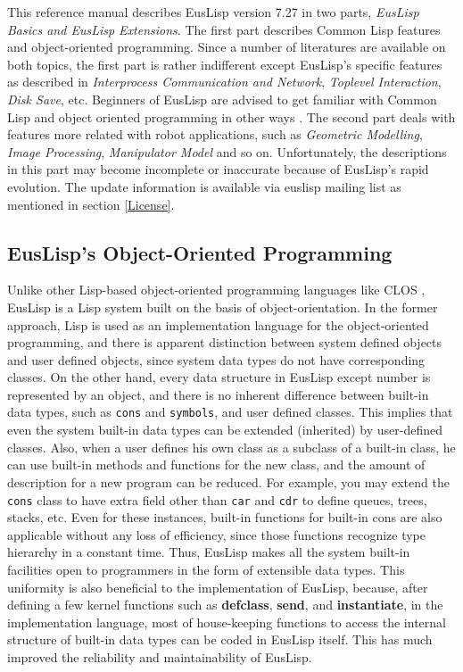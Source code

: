 This reference manual describes EusLisp version 7.27 in two parts,
{\em  EusLisp Basics and EusLisp Extensions}.
The first part describes Common Lisp features and object-oriented 
programming. Since a number of literatures are available on both topics,
the first part is rather indifferent except EusLisp's specific
features as described in {\em Interprocess Communication and Network},
{\em Toplevel Interaction}, {\em Disk Save}, etc.
Beginners of EusLisp are advised to get familiar with
Common Lisp and object oriented programming in other ways
\cite{CLtL,CLOS:Keene}.
The second part deals with features more related with robot applications,
such as
{\em Geometric Modelling}, {\em Image Processing}, {\em Manipulator Model}
and so on.
Unfortunately, 
the descriptions in this part may become incomplete or inaccurate
because of EusLisp's rapid evolution.
The update information is available via euslisp mailing list
as mentioned in section \ref{License}.

\subsection{EusLisp's Object-Oriented Programming}
Unlike other Lisp-based object-oriented programming languages like
CLOS \cite{CLOS:Keene},
EusLisp is a Lisp system built on the basis of object-orientation.
In the former approach, Lisp is used as an
implementation language for the object-oriented programming,
and there is apparent distinction between system defined objects
and user defined objects, since system data types do not have 
corresponding classes.
On the other hand, every data structure in EusLisp except number is 
represented by an object, and there is no inherent difference between
built-in data types, such as {\tt cons} and {\tt symbols},
and user defined classes.
This implies that even the system built-in data types
can be extended (inherited) by user-defined classes.
Also, when a user defines his own class as a subclass of a built-in class,
he can use built-in methods and functions for the new class,
and the amount of description for a new program can be reduced.
For example, you may extend the {\tt cons} class to have extra field other
than {\tt car} and {\tt cdr} to define queues, trees, stacks, etc.
Even for these instances, built-in functions for
built-in cons are also applicable without any loss of efficiency,
since those functions recognize type hierarchy in a constant time.
Thus, EusLisp makes all the system built-in facilities open to programmers
in the form of extensible data types.
This uniformity is also beneficial to the implementation of EusLisp,
because, after defining a few kernel functions
such as {\bf defclass}, {\bf send}, and {\bf instantiate},
in the implementation language,
most of house-keeping functions to access the internal structure of built-in
data types can be coded in EusLisp itself.
This has much improved the reliability and maintainability of EusLisp.

